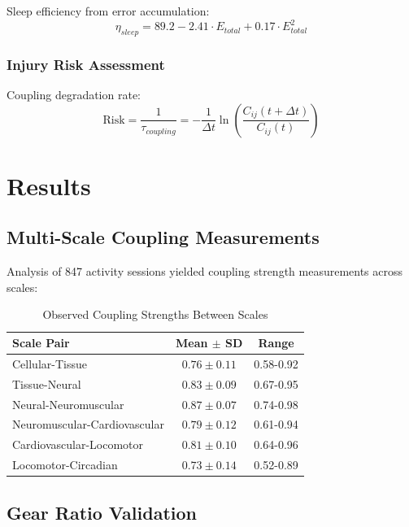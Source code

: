 \documentclass[12pt,twocolumn]{article}
\begin{document}
Sleep efficiency from error accumulation:
\begin{equation}
\eta_{sleep} = 89.2 - 2.41 \cdot E_{total} + 0.17 \cdot E_{total}^2
\end{equation}

\subsubsection{Injury Risk Assessment}

Coupling degradation rate:
\begin{equation}
\text{Risk} = \frac{1}{\tau_{coupling}} = -\frac{1}{\Delta t}\ln\left(\frac{C_{ij}(t+\Delta t)}{C_{ij}(t)}\right)
\end{equation}

\section{Results}

\subsection{Multi-Scale Coupling Measurements}

Analysis of 847 activity sessions yielded coupling strength measurements across scales:

\begin{table}[H]
\centering
\caption{Observed Coupling Strengths Between Scales}
\begin{tabular}{lcc}
\toprule
Scale Pair & Mean $\pm$ SD & Range \\
\midrule
Cellular-Tissue & $0.76 \pm 0.11$ & 0.58-0.92 \\
Tissue-Neural & $0.83 \pm 0.09$ & 0.67-0.95 \\
Neural-Neuromuscular & $0.87 \pm 0.07$ & 0.74-0.98 \\
Neuromuscular-Cardiovascular & $0.79 \pm 0.12$ & 0.61-0.94 \\
Cardiovascular-Locomotor & $0.81 \pm 0.10$ & 0.64-0.96 \\
Locomotor-Circadian & $0.73 \pm 0.14$ & 0.52-0.89 \\
\bottomrule
\end{tabular}
\end{table}

\subsection{Gear Ratio Validation}
\end{document}
